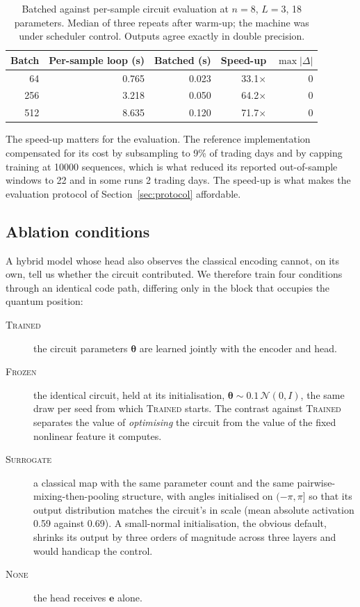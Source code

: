\begin{table}[t]
  \centering
  \caption{Batched against per-sample circuit evaluation at $n=8$, $L=3$,
  \num{18} parameters. Median of three repeats after warm-up; the machine was
  under scheduler control. Outputs agree exactly in double precision.}
  \label{tab:batching}
  \begin{tabular}{rrrrr}
    \toprule
    Batch & Per-sample loop (s) & Batched (s) & Speed-up & $\max|\Delta|$ \\
    \midrule
    64  & 0.765 & 0.023 & 33.1$\times$ & 0 \\
    256 & 3.218 & 0.050 & 64.2$\times$ & 0 \\
    512 & 8.635 & 0.120 & 71.7$\times$ & 0 \\
    \bottomrule
  \end{tabular}
\end{table}

The speed-up matters for the evaluation. The reference implementation compensated
for its cost by subsampling to 9\% of trading days and by capping training at
\num{10000} sequences, which is what reduced its reported out-of-sample windows
to 22 and in some runs 2 trading days. The speed-up is what makes the evaluation
protocol of Section~\ref{sec:protocol} affordable.

\subsection{Ablation conditions}
\label{sec:method:ablation}
A hybrid model whose head also observes the classical encoding cannot, on its
own, tell us whether the circuit contributed. We therefore train four conditions
through an identical code path, differing only in the block that occupies the
quantum position:

\begin{description}
  \item[\textsc{Trained}] the circuit parameters $\boldsymbol{\theta}$ are
    learned jointly with the encoder and head.
  \item[\textsc{Frozen}] the identical circuit, held at its initialisation,
    $\boldsymbol{\theta} \sim 0.1\,\mathcal{N}(0, I)$, the same draw per seed
    from which \textsc{Trained} starts. The contrast against \textsc{Trained} separates the value of
    \emph{optimising} the circuit from the value of the fixed nonlinear feature
    it computes.
  \item[\textsc{Surrogate}] a classical map with the same parameter count and
    the same pairwise-mixing-then-pooling structure, with angles initialised on
    $(-\pi, \pi]$ so that its output distribution matches the circuit's in
    scale (mean absolute activation \num{0.59} against \num{0.69}). A
    small-normal initialisation, the obvious default, shrinks its output by
    three orders of magnitude across three layers and would handicap the
    control.
  \item[\textsc{None}] the head receives $\mathbf{e}$ alone.
\end{description}

